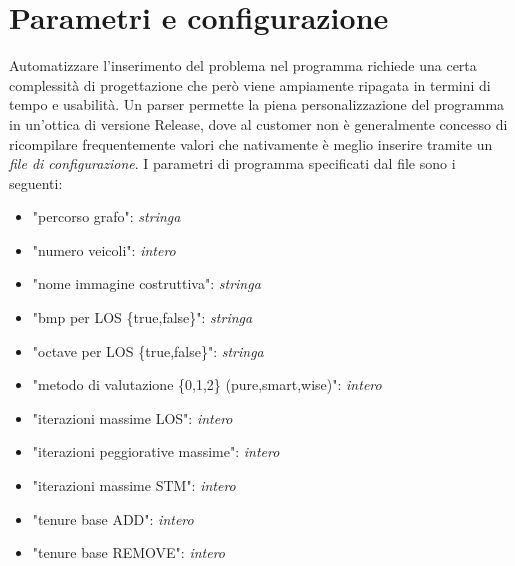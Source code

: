 \section{Parametri e configurazione}
\label{sec:cfg}
	Automatizzare l'inserimento del problema nel programma richiede una certa complessità di progettazione che però viene 
	ampiamente ripagata in termini di tempo e usabilità.
	Un parser permette la piena personalizzazione del programma in un'ottica di versione Release, 
	dove al customer non è generalmente concesso di ricompilare
	frequentemente valori che nativamente è meglio inserire tramite un \emph{file di configurazione}. 
	I parametri di programma specificati dal file sono i seguenti:
	\begin{itemize}
	  \item "percorso grafo": \emph{stringa}
	  \item "numero veicoli": \emph{intero}
	  \item "nome immagine costruttiva": \emph{stringa}
	  \item "bmp per LOS \{true,false\}": \emph{stringa}
	  \item "octave per LOS \{true,false\}": \emph{stringa}
	  \item "metodo di valutazione \{0,1,2\} (pure,smart,wise)": \emph{intero}
	  \item "iterazioni massime LOS": \emph{intero}
	  \item "iterazioni peggiorative massime": \emph{intero}
	  \item "iterazioni massime STM": \emph{intero}
	  \item "tenure base ADD": \emph{intero}
	  \item "tenure base REMOVE": \emph{intero}
	\end{itemize}

